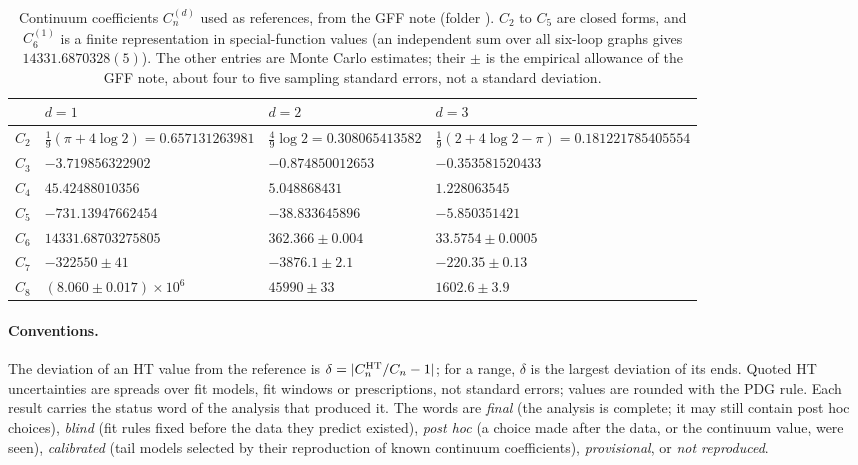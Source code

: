 \begin{table}[ht]
\centering\footnotesize\renewcommand{\arraystretch}{1.2}
\begin{tabular}{@{}clll@{}}
\toprule
 & $d=1$ & $d=2$ & $d=3$ \\
\midrule
$C_2$ & $\tfrac19(\pi+4\log2)=0.657131263981$ & $\tfrac49\log2=0.308065413582$ & $\tfrac19(2+4\log2-\pi)=0.181221785405554$ \\
$C_3$ & $-3.719856322902$ & $-0.874850012653$ & $-0.353581520433$ \\
$C_4$ & $45.42488010356$ & $5.048868431$ & $1.228063545$ \\
$C_5$ & $-731.13947662454$ & $-38.833645896$ & $-5.850351421$ \\
$C_6$ & $14331.68703275805$ & $362.366\pm0.004$ & $33.5754\pm0.0005$ \\
$C_7$ & $-322550\pm41$ & $-3876.1\pm2.1$ & $-220.35\pm0.13$ \\
$C_8$ & $(8.060\pm0.017)\times10^6$ & $45990\pm33$ & $1602.6\pm3.9$ \\
\bottomrule
\end{tabular}
\caption{Continuum coefficients $C_n^{(d)}$ used as references, from the GFF note (folder ). $C_2$ to
$C_5$ are closed forms, and $C_6^{(1)}$ is a finite representation in special-function values (an independent sum over
all six-loop graphs gives $14331.6870328(5)$). The other entries are Monte Carlo estimates; their $\pm$ is the empirical
allowance of the GFF note, about four to five sampling standard errors, not a standard deviation.}
\label{tab:refvals}
\end{table}

\paragraph{Conventions.} The deviation of an HT value from the reference is $\delta=|C_n^{\rm HT}/C_n-1|$; for a range,
$\delta$ is the largest deviation of its ends. Quoted HT uncertainties are spreads over fit models, fit windows or
prescriptions, not standard errors; values are rounded with the PDG rule. Each result carries the status word of the
analysis that produced it. The words are \emph{final} (the analysis is complete; it may still contain post hoc
choices), \emph{blind} (fit rules fixed before the data they predict existed), \emph{post hoc} (a choice
made after the data, or the continuum value, were seen), \emph{calibrated} (tail models selected by their reproduction of
known continuum coefficients), \emph{provisional}, or \emph{not reproduced}.

